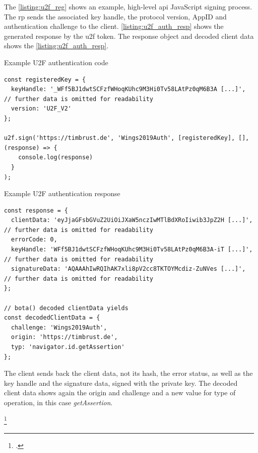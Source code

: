 The \autoref{listing:u2f_reg} shows an example, high-level \gls{api} JavaScript signing process. The \gls{rp} sends the associated key handle, the protocol version, AppID and authentication challenge to the client. \autoref{listing:u2f_auth_resp} shows the generated response by the \gls{u2f} token. The response object and decoded client data shows the \autoref{listing:u2f_auth_resp}.
\\
\begin{example}{Example U2F authentication code}
\begin{verbatim}
const registeredKey = {
  keyHandle: '_WFf5BJ1dwtSCFzfWHoqKUhc9M3Hi0Tv58LAtPz0qM6B3A [...]', // further data is omitted for readability
  version: 'U2F_V2'
};

u2f.sign('https://timbrust.de', 'Wings2019Auth', [registeredKey], [], (response) => {
    console.log(response)
  }
);
\end{verbatim}
\label{listing:u2f_auth}
\end{example}

\begin{example}{Example U2F authentication response}
\begin{verbatim}
const response = {
  clientData: 'eyJjaGFsbGVuZ2UiOiJXaW5nczIwMTlBdXRoIiwib3JpZ2H [...]', // further data is omitted for readability
  errorCode: 0,
  keyHandle: 'WFf5BJ1dwtSCFzfWHoqKUhc9M3Hi0Tv58LAtPz0qM6B3A-iT [...]', // further data is omitted for readability
  signatureData: 'AQAAAhIwRQIhAK7xli8pV2cc8TKTOYMcdiz-ZuNVes [...]', // further data is omitted for readability
};

// bota() decoded clientData yields
const decodedClientData = {
  challenge: 'Wings2019Auth',
  origin: 'https://timbrust.de',
  typ: 'navigator.id.getAssertion'
};
\end{verbatim}
\label{listing:u2f_auth_resp}
\end{example}

The client sends back the client data, not its hash, the error status, as well as the key handle and the signature data, signed with the private key. The decoded client data shows again the origin and challenge and a new value for type of operation, in this case \textit{getAssertion}.

\footcites[See][1--2, 4]{u2f-overview}[See][4]{u2f-js-api}